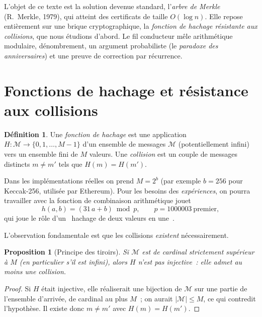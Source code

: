 \documentclass[11pt,a4paper]{article}
\theoremstyle{definition}\newtheorem{definition}{Définition}
\theoremstyle{plain}\newtheorem{theoreme}{Théorème}\newtheorem{proposition}{Proposition}\newtheorem{lemme}{Lemme}
\theoremstyle{remark}\newtheorem{remarque}{Remarque}
\begin{document}
L'objet de ce texte est la solution devenue standard, l'\emph{arbre de Merkle} (R.~Merkle, 1979),
qui atteint des certificats de taille $O(\log n)$. Elle repose entièrement sur une brique
cryptographique, la \emph{fonction de hachage résistante aux collisions}, que nous étudions
d'abord. Le fil conducteur mêle arithmétique modulaire, dénombrement, un argument probabiliste
(le \emph{paradoxe des anniversaires}) et une preuve de correction par récurrence.

\section{Fonctions de hachage et résistance aux collisions}

\begin{definition}
Une \emph{fonction de hachage} est une application $H : \mathcal{M} \to \{0,1,\dots,M-1\}$ d'un
ensemble de messages $\mathcal{M}$ (potentiellement infini) vers un ensemble fini de $M$ valeurs.
Une \emph{collision} est un couple de messages distincts $m \neq m'$ tels que $H(m) = H(m')$.
\end{definition}

Dans les implémentations réelles on prend $M = 2^{b}$ (par exemple $b = 256$ pour Keccak-256,
utilisée par Ethereum). Pour les besoins des \emph{expériences}, on pourra travailler avec la
fonction de combinaison arithmétique jouet
\begin{equation}\label{eq:parent}
  h(a,b) = (31\,a + b) \bmod p, \qquad p = 1000003 \ \text{premier},
\end{equation}
qui joue le rôle d'un \guillemotleft~hachage de deux valeurs en une~\guillemotright.

L'observation fondamentale est que les collisions \emph{existent} nécessairement.

\begin{proposition}[Principe des tiroirs]\label{prop:tiroirs}
Si $\mathcal{M}$ est de cardinal strictement supérieur à $M$ (en particulier s'il est infini),
alors $H$ n'est pas injective~: elle admet au moins une collision.
\end{proposition}

\begin{proof}
Si $H$ était injective, elle réaliserait une bijection de $\mathcal{M}$ sur une partie de
l'ensemble d'arrivée, de cardinal au plus $M$~; on aurait $|\mathcal{M}| \le M$, ce qui contredit
l'hypothèse. Il existe donc $m \neq m'$ avec $H(m) = H(m')$.
\end{proof}
\end{document}
